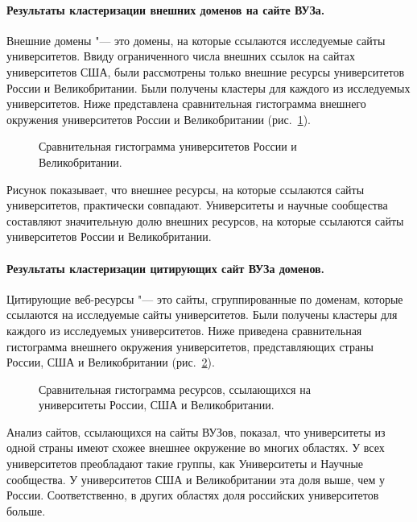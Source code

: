 \paragraph{Результаты кластеризации внешних доменов на сайте ВУЗа.} Внешние домены "--- это домены, на которые ссылаются исследуемые сайты университетов. Ввиду ограниченного числа внешних ссылок на сайтах университетов США, были рассмотрены только внешние ресурсы университетов России и Великобритании. Были получены кластеры для каждого из исследуемых университетов. Ниже представлена сравнительная гистограмма внешнего окружения университетов России и Великобритании (рис.~\cref{fig:histogramUKRU}).

\begin{figure}[ht]
	\caption{Сравнительная гистограмма университетов России и Великобритании.}\label{fig:histogramUKRU}
\end{figure}

Рисунок показывает, что внешнее ресурсы, на которые ссылаются сайты университетов, практически совпадают. Университеты и научные сообщества составляют значительную долю внешних ресурсов, на которые ссылаются сайты университетов России и Великобритании.

\paragraph{Результаты кластеризации цитирующих сайт ВУЗа доменов.} Цитирующие веб-ресурсы "--- это сайты, сгруппированные по доменам, которые ссылаются на исследуемые сайты университетов. Были получены кластеры для каждого из исследуемых университетов. Ниже приведена сравнительная гистограмма внешнего окружения университетов, представляющих страны России, США и Великобритании (рис.~\cref{fig:histogramUKRUUS}).

\begin{figure}[ht]
	\caption{Сравнительная гистограмма ресурсов, ссылающихся на университеты России, США и Великобритании.}\label{fig:histogramUKRUUS}
\end{figure}

Анализ сайтов, ссылающихся на сайты ВУЗов, показал, что университеты из одной страны имеют схожее внешнее окружение во многих областях. У всех университетов преобладают такие группы, как Университеты и Научные сообщества. У университетов США и Великобритании эта доля выше, чем у России. Соответственно, в других областях доля российских университетов больше.

